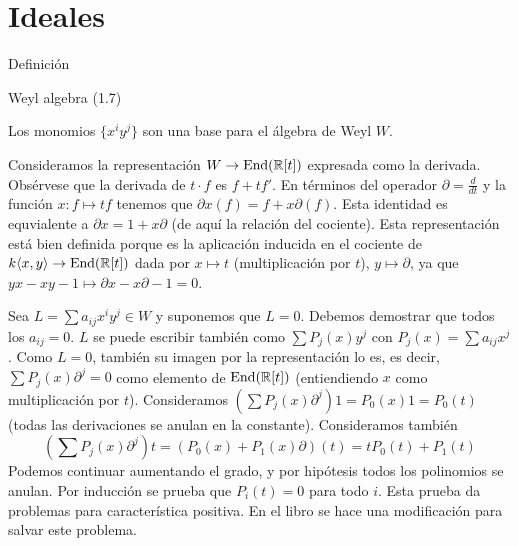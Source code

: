 \documentclass[ANAyTR.tex]{subfiles}
\begin{document}
\section{Ideales}

Definición

Weyl algebra (1.7)

\begin{prop}
Los monomios $\{x^iy^j\}$ son una base para el álgebra de Weyl $W$.
\end{prop}
\begin{dem}
Consideramos la representación $W\to\operatorname{End}(\mathbb{R}[t])$ expresada como la derivada. Obsérvese que la derivada de $t\cdot f$ es $f+tf'$. En términos del operador $\partial=\frac{d}{dt}$ y la función $x: f\mapsto tf$ tenemos que $\partial x(f)=f+x\partial (f)$. Esta identidad es equvialente a $\partial x=1+x\partial$ (de aquí la relación del cociente). Esta representación está bien definida porque es la aplicación inducida en el cociente de $k\langle{x,y}\rangle\to\operatorname{End}(\mathbb{R}[t])$ dada por $x\mapsto t$ (multiplicación por $t$), $y\mapsto\partial$, ya que $yx-xy-1\mapsto \partial x-x\partial -1=0$. 

Sea $L=\sum a_{ij}x^iy^j\in W$ y suponemos que $L=0$. Debemos demostrar que todos los $a_{ij}=0$. $L$ se puede escribir también como $\sum P_j(x)y^j$ con $P_j(x)=\sum a_{ij}x^j$. Como $L=0$, también su imagen por la representación lo es, es decir, $\sum P_j(x)\partial^j=0$ como elemento de $\operatorname{End}(\mathbb{R}[t])$ (entiendiendo $x$ como multiplicación por $t$). Consideramos $(\sum P_j(x)\partial^j)1=P_0(x)1=P_0(t)$ (todas las derivaciones se anulan en la constante). Consideramos también 
\[
(\sum P_j(x)\partial^j)t=(P_0(x)+P_1(x)\partial)(t)=tP_0(t)+P_1(t)
\]
Podemos continuar aumentando el grado, y por hipótesis todos los polinomios se anulan. Por inducción se prueba que $P_i(t)=0$ para todo $i$. Esta prueba da problemas para característica positiva. En el libro se hace una modificación para salvar este problema.

\end{dem}
\end{document}
